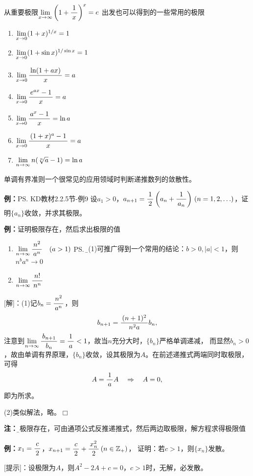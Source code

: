 从重要极限$\limx{\infty}\left(1+\df1x\right)^x=e$
出发也可以得到的一些常用的极限
\begin{thx}
\begin{enumerate}[(1)]
  \item $\limx{0}(1+x)^{1/x}=1$ 
  \item $\limx 0(1+\sin x)^{1/\sin x}=1$ 
  \item $\limx 0\df{\ln(1+ax)}{x}=a$
  \item $\limx 0\df{e^{ax}-1}{x}=a$ 
  \item $\limx 0\df{a^x-1}{x}=\ln a$ 
  \item $\limx 0\df{(1+x)^a-1}x=a$
  \item $\limn n(\sqrt[n]{a}-1)=\ln a$ 
\end{enumerate}
\end{thx}

单调有界准则一个很常见的应用领域时判断递推数列的敛散性。

{\bf 例：}\ps{KD教材2.2.5节-例9}
设$a_1>0$，$a_{n+1}=\df 12\left(a_n+\df 1{a_n}\right)\,
(n=1,2,\ldots)$，证明$\{a_n\}$收敛，并求其极限。

{\bf 例：}证明极限存在，然后求出极限的值
\begin{enumerate}[(1)]
  \setlength{\itemindent}{1cm}
  \item $\limn\df{n^2}{a^n}\quad (a>1)$%
  \ps{\b 由(1)可推广得到一个常用的结论：$b>0,|a|<1$，则$n^ba^n\to 0$}
  \item $\limn\df{n!}{n^n}$%
\end{enumerate}

[解]：(1)\;记$b_n=\df{n^2}{a^n}$，则
$$b_{n+1}=\df{(n+1)^2}{n^2a}b_n,$$
注意到$\limn\df{b_{n+1}}{b_n}=\df1a<1$，故当$n$充分大时，$\{b_n\}$严格单调递减，
而显然$b_n>0$，故由单调有界原理，$\{b_n\}$收敛，设其极限为$A$。在前述递推式两端同时取极限，
可得
$$A=\df1aA\quad\Rightarrow\quad A=0,$$
即为所求。

(2)\;类似解法，略。\hfill $\Box$

{\bf 注：}{\b 若极限存在，可由通项公式反推递推式，然后两边取极限，解方程求得极限值}

{\bf 例：}$x_1=\df c2$，$x_{n+1}=\df c2+\df{x_n^2}2\,(n\in\mathbb{Z}_+)$，
证明：若$c>1$，则$\{x_n\}$发散。

[提示]：设极限为$A$，则$A^2-2A+c=0$，$c>1$时，无解，必发散。

